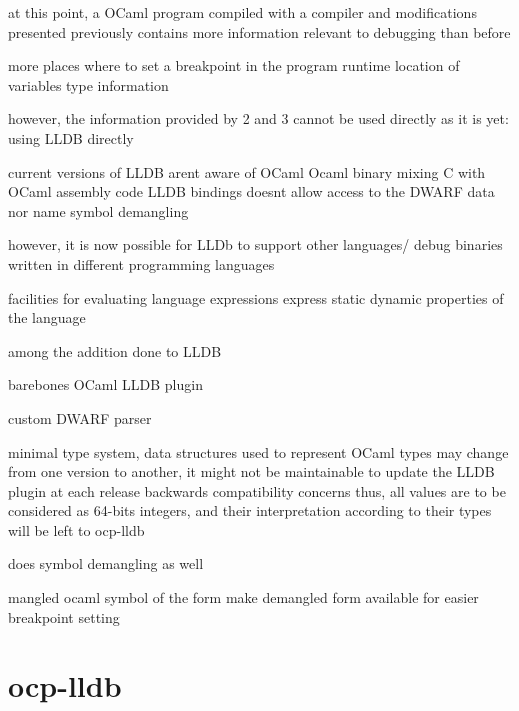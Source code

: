 at this point, a OCaml program compiled with a compiler and modifications
presented previously contains more information relevant to debugging than before

more places where to set a breakpoint in the program
runtime location of variables
type information

however, the information provided by 2 and 3 cannot be used directly as it is yet:
using LLDB directly


current versions of LLDB arent aware of OCaml
Ocaml binary mixing C with OCaml assembly code
LLDB bindings doesnt allow access to the DWARF data nor name symbol demangling

however, it is now possible for LLDb to support other languages/ debug binaries
written in different programming languages

facilities for evaluating language expressions
express static dynamic properties of the language

among the addition done to LLDB

barebones OCaml LLDB plugin

custom DWARF parser

minimal type system, data structures used to represent OCaml types may
    change from one version to another, it might not be maintainable to update
    the LLDB plugin at each release
    backwards compatibility concerns
    thus, all values are to be considered as 64-bits integers, and their
    interpretation according to their types will be left to ocp-lldb

    does symbol demangling as well

    mangled ocaml symbol of the form
    make demangled form available for easier breakpoint setting

\section{ocp-lldb}



\begin{figure}
  \centering
{}
\end{figure}

